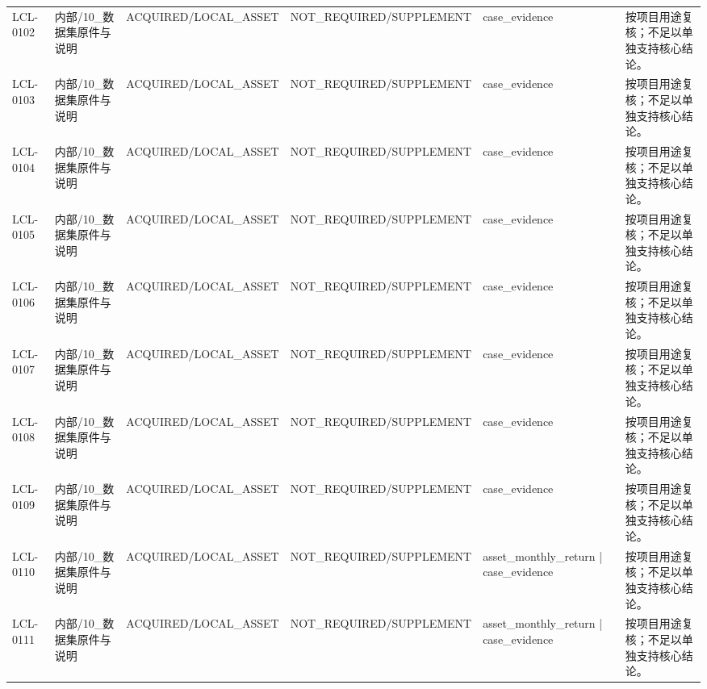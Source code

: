 \begin{landscape}
\begin{longtable}{p{1.8cm}p{2.6cm}p{2.6cm}p{2.6cm}p{4.8cm}p{7.2cm}}
LCL-0102 & 内部/\allowbreak{}10\_\allowbreak{}数据集原件与说明 & ACQUIRED/\allowbreak{}LOCAL\_\allowbreak{}ASSET & NOT\_\allowbreak{}REQUIRED/\allowbreak{}SUPPLEMENT & case\_\allowbreak{}evidence & 按项目用途复核；不足以单独支持核心结论。\\
LCL-0103 & 内部/\allowbreak{}10\_\allowbreak{}数据集原件与说明 & ACQUIRED/\allowbreak{}LOCAL\_\allowbreak{}ASSET & NOT\_\allowbreak{}REQUIRED/\allowbreak{}SUPPLEMENT & case\_\allowbreak{}evidence & 按项目用途复核；不足以单独支持核心结论。\\
LCL-0104 & 内部/\allowbreak{}10\_\allowbreak{}数据集原件与说明 & ACQUIRED/\allowbreak{}LOCAL\_\allowbreak{}ASSET & NOT\_\allowbreak{}REQUIRED/\allowbreak{}SUPPLEMENT & case\_\allowbreak{}evidence & 按项目用途复核；不足以单独支持核心结论。\\
LCL-0105 & 内部/\allowbreak{}10\_\allowbreak{}数据集原件与说明 & ACQUIRED/\allowbreak{}LOCAL\_\allowbreak{}ASSET & NOT\_\allowbreak{}REQUIRED/\allowbreak{}SUPPLEMENT & case\_\allowbreak{}evidence & 按项目用途复核；不足以单独支持核心结论。\\
LCL-0106 & 内部/\allowbreak{}10\_\allowbreak{}数据集原件与说明 & ACQUIRED/\allowbreak{}LOCAL\_\allowbreak{}ASSET & NOT\_\allowbreak{}REQUIRED/\allowbreak{}SUPPLEMENT & case\_\allowbreak{}evidence & 按项目用途复核；不足以单独支持核心结论。\\
LCL-0107 & 内部/\allowbreak{}10\_\allowbreak{}数据集原件与说明 & ACQUIRED/\allowbreak{}LOCAL\_\allowbreak{}ASSET & NOT\_\allowbreak{}REQUIRED/\allowbreak{}SUPPLEMENT & case\_\allowbreak{}evidence & 按项目用途复核；不足以单独支持核心结论。\\
LCL-0108 & 内部/\allowbreak{}10\_\allowbreak{}数据集原件与说明 & ACQUIRED/\allowbreak{}LOCAL\_\allowbreak{}ASSET & NOT\_\allowbreak{}REQUIRED/\allowbreak{}SUPPLEMENT & case\_\allowbreak{}evidence & 按项目用途复核；不足以单独支持核心结论。\\
LCL-0109 & 内部/\allowbreak{}10\_\allowbreak{}数据集原件与说明 & ACQUIRED/\allowbreak{}LOCAL\_\allowbreak{}ASSET & NOT\_\allowbreak{}REQUIRED/\allowbreak{}SUPPLEMENT & case\_\allowbreak{}evidence & 按项目用途复核；不足以单独支持核心结论。\\
LCL-0110 & 内部/\allowbreak{}10\_\allowbreak{}数据集原件与说明 & ACQUIRED/\allowbreak{}LOCAL\_\allowbreak{}ASSET & NOT\_\allowbreak{}REQUIRED/\allowbreak{}SUPPLEMENT & asset\_\allowbreak{}monthly\_\allowbreak{}return | case\_\allowbreak{}evidence & 按项目用途复核；不足以单独支持核心结论。\\
LCL-0111 & 内部/\allowbreak{}10\_\allowbreak{}数据集原件与说明 & ACQUIRED/\allowbreak{}LOCAL\_\allowbreak{}ASSET & NOT\_\allowbreak{}REQUIRED/\allowbreak{}SUPPLEMENT & asset\_\allowbreak{}monthly\_\allowbreak{}return | case\_\allowbreak{}evidence & 按项目用途复核；不足以单独支持核心结论。\\

\end{longtable}
\end{landscape}
